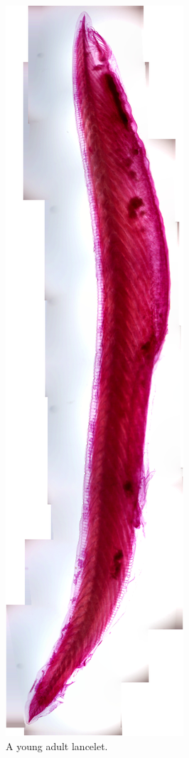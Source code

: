 \begin{figure}

{\centering \includegraphics[width=0.7\linewidth]{./figures/echinodermata/lancelet_wm}

}

\caption{A young adult lancelet.}\label{fig:lanceletwm}
\end{figure}

